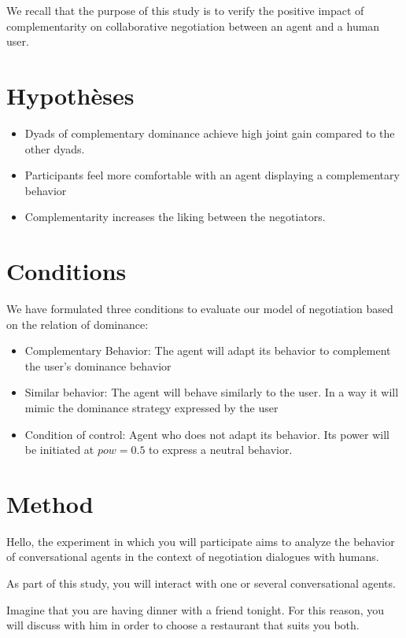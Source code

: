 \documentclass [french]{paper}
\begin{document}
		
		We recall that the purpose of this study is to verify the positive impact of complementarity on collaborative negotiation between an agent and a human user.
	
		
		\section{Hypothèses}
		\begin{itemize}
			\item Dyads of complementary dominance achieve high joint gain  compared to the other dyads.
			\item Participants feel more comfortable with an agent displaying a complementary behavior
			\item Complementarity increases the liking between the negotiators.
		\end{itemize}

			
		\section{Conditions}
			We have formulated three conditions to evaluate our model of negotiation based on the relation of dominance:

			\begin{itemize}
				\item Complementary Behavior: The agent will adapt its behavior to complement the user's dominance behavior
				
				\item Similar behavior: The agent will behave similarly to the user. In a way it will mimic the dominance strategy expressed by the user
				
				\item Condition of control: Agent who does not adapt its behavior. Its power will be initiated at $ pow = 0.5 $ to express a neutral behavior.
			\end{itemize}
			
			
		\section{Method}
			Hello, the experiment in which you will participate aims to analyze the behavior of conversational agents in the context of negotiation dialogues with  humans.
			
			As part of this study, you will interact with one or several conversational agents.
			
			Imagine that you are having dinner with a friend tonight. For this reason, you will discuss with him in order to choose a restaurant that suits you both.
			
\end{document}
